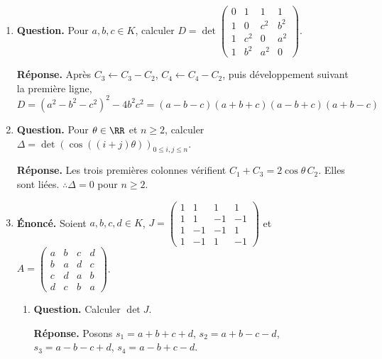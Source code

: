 \documentclass[12pt, a4paper]{article}
\begin{document}
\begin{enumerate}[label=5.\arabic*., start=54]
\begin{minipage}[t]{\linewidth}
\begin{enumerate}[\arabic*.]
        $\therefore A$ est une matrice de permutation dont les $1$ sont éventuellement remplacés par $-1$.
        Réciproquement, ces matrices ont un déterminant $\pm1$.

\end{enumerate}
\end{minipage}

  \item \begin{minipage}[t]{\linewidth}\raggedright
\textbf{Question.} Pour $a,b,c\in K$, calculer $\displaystyle D=\det\begin{pmatrix}0&1&1&1\\1&0&c^2&b^2\\1&c^2&0&a^2\\1&b^2&a^2&0\end{pmatrix}$.
\par\smallskip
\textbf{Réponse.} Après $C_3\leftarrow C_3-C_2$, $C_4\leftarrow C_4-C_2$, puis développement suivant la première ligne,
    \[
      D=(a^2-b^2-c^2)^2-4b^2c^2
       =(a-b-c)(a+b+c)(a-b+c)(a+b-c)
    \]
\end{minipage}

  \item \begin{minipage}[t]{\linewidth}\raggedright
\textbf{Question.} Pour $\theta\in\RR$ et $n\geq2$, calculer $\Delta=\det(\cos((i+j)\theta))_{0\leq i,j\leq n}$.
\par\smallskip
\textbf{Réponse.} Les trois premières colonnes vérifient $C_1+C_3=2\cos\theta\,C_2$.
    Elles sont liées. $\therefore\Delta=0$ pour $n\geq2$.
\end{minipage}

  \item \begin{minipage}[t]{\linewidth}\raggedright
\textbf{Énoncé.} Soient $a,b,c,d\in K$, $\displaystyle J=\begin{pmatrix}1&1&1&1\\1&1&-1&-1\\1&-1&-1&1\\1&-1&1&-1\end{pmatrix}$ et $\displaystyle A=\begin{pmatrix}a&b&c&d\\b&a&d&c\\c&d&a&b\\d&c&b&a\end{pmatrix}$.

\begin{enumerate}[\arabic*.]
        \item \textbf{Question.} Calculer $\det J$.
\par\smallskip
\textbf{Réponse.} Posons $s_1=a+b+c+d$, $s_2=a+b-c-d$, $s_3=a-b-c+d$, $s_4=a-b+c-d$.


\end{enumerate}
\end{minipage}
\end{enumerate}
\end{document}
